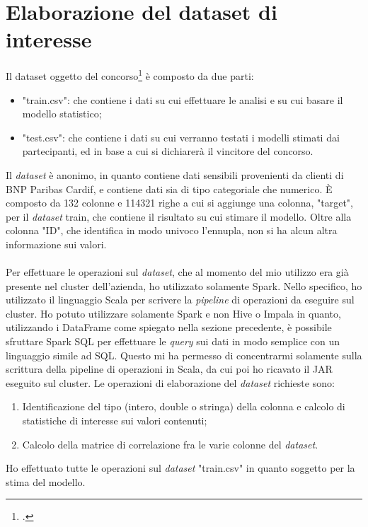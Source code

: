 \section{Elaborazione del dataset di interesse} \label{dataset}
Il dataset oggetto del concorso\footcite{site:kaggle-dataset} è composto da due parti:
\begin{itemize}
	\item "train.csv": che contiene i dati su cui effettuare le analisi e su cui basare il modello statistico;
	\item "test.csv": che contiene i dati su cui verranno testati i modelli stimati dai partecipanti, ed in base a cui si dichiarerà il vincitore del concorso.
\end{itemize}
Il \textit{dataset} è anonimo, in quanto contiene dati sensibili provenienti da clienti di BNP Paribas Cardif, e contiene dati sia di tipo categoriale che numerico.  È composto da 132 colonne e 114321 righe a cui si aggiunge una colonna, "target", per il \textit{dataset} train, che contiene il risultato su cui stimare il modello. Oltre alla colonna "ID", che identifica in modo univoco l'ennupla, non si ha alcun altra informazione sui valori.\\\\
Per effettuare le operazioni sul \textit{dataset}, che al momento del mio utilizzo era già presente nel \gls{cluster} dell'azienda, ho utilizzato solamente Spark. Nello specifico, ho utilizzato il linguaggio Scala per scrivere la \textit{pipeline} di operazioni da eseguire sul \gls{cluster}. Ho potuto utilizzare solamente Spark e non Hive o Impala in quanto, utilizzando i DataFrame come spiegato nella sezione precedente, è possibile sfruttare Spark SQL per effettuare le \textit{query} sui dati in modo semplice con un linguaggio simile ad SQL.
Questo mi ha permesso di concentrarmi solamente sulla scrittura della pipeline di operazioni in Scala, da cui poi ho ricavato il \gls{JAR} eseguito sul \gls{cluster}.
Le operazioni di elaborazione del \textit{dataset} richieste sono:
\begin{enumerate}
	\item Identificazione del tipo (intero, double o stringa) della colonna e calcolo di statistiche di interesse sui valori contenuti;
	\item Calcolo della matrice di correlazione fra le varie colonne del \textit{dataset}.
\end{enumerate}
Ho effettuato tutte le operazioni sul \textit{dataset} "train.csv" in quanto soggetto per la stima del modello.

